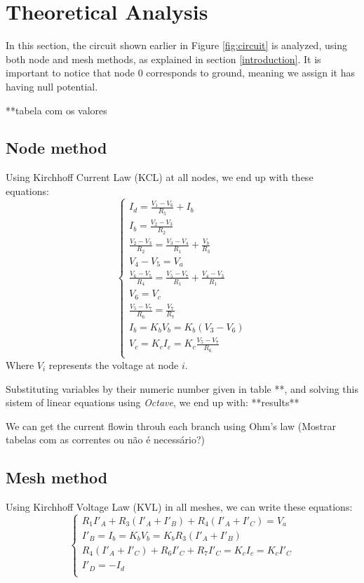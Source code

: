 \section{Theoretical Analysis}
\label{sec:analysis}

In this section, the circuit shown earlier in Figure \ref{fig:circuit} is analyzed, using both node and mesh methods, as explained in section \ref{introduction}. It is important to notice that node 0 corresponds to ground, meaning we assign it has having null potential.
\par
**tabela com os valores

\subsection{Node method}
Using Kirchhoff Current Law (KCL) at all nodes, we end up with these equations:
\begin{equation*}
\begin{cases}
  I_d = \frac{V_1 - V_6}{R_5} + I_b \\
  I_b = \frac{V_2 - V_3}{R_2} \\
  \frac{V_2 - V_3}{R_2} = \frac{V_3 - V_4}{R_1} + \frac{V_b}{R_3} \\
  V_4 - V_5 = V_a \\
  \frac{V_6 - V_5}{R_4} = \frac{V_5 - V_7}{R_1} + \frac{V_4 - V_3}{R_1} \\ %
  V_6 = V_c \\
  \frac{V_5 - V_7}{R_6} = \frac{V_7}{R_7} \\
  I_b = K_bV_b = K_b(V_3 - V_6) \\
  V_c = K_cI_c = K_c \frac{V_5 - V_7}{R_6} \\
\end{cases}
\end{equation*}
Where $V_i$ represents the voltage at node $i$.
\par
Substituting variables by their numeric number given in table **, and solving this sistem of linear equations using \textit{Octave}, we end up with: **results**
\par
We can get the current flowin throuh each branch using Ohm's law
(Mostrar tabelas com as correntes ou não é necessário?)

\subsection{Mesh method}
Using Kirchhoff Voltage Law (KVL) in all meshes, we can write these equations:
\begin{equation*}
\begin{cases}
  R_1I'_A + R_3(I'_A + I'_B) + R_4(I'_A + I'_C) = V_a \\
  I'_B = I_b = K_bV_b = K_bR_3(I'_A + I'_B) \\
  R_4(I'_A+I'_C) + R_6I'_C + R_7I'_C = K_cI_c = K_cI'_C \\
  I'_D = -I_d \\
\end{cases}
\end{equation*}





